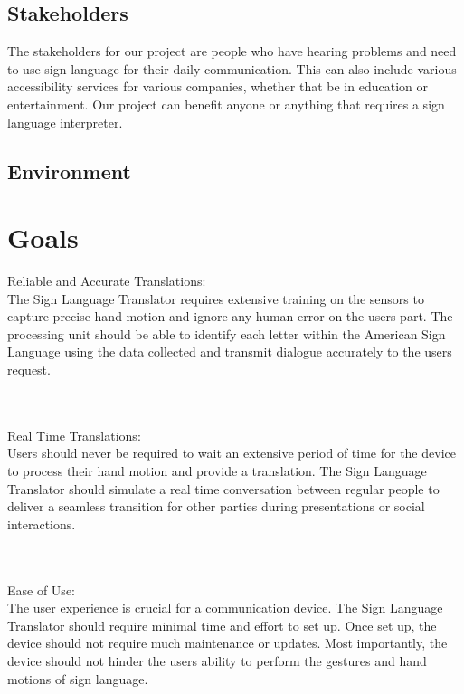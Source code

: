 \documentclass{article}
\begin{document}
\subsection{Stakeholders}

The stakeholders for our project are people who have hearing problems and need to use sign language for their daily
communication. This can also include various accessibility services for various companies, whether that be in education
or entertainment. Our project can benefit anyone or anything that requires a sign language interpreter.

\subsection{Environment}


\section{Goals}

Reliable and Accurate Translations:\\
The Sign Language Translator requires extensive training on the sensors to capture precise hand motion and ignore any
human error on the user\textquotesingle s part. The processing unit should be able to identify each letter within the American Sign Language
using the data collected and transmit dialogue accurately to the user\textquotesingle s request.

\\
\\Real Time Translations:\\
User\textquotesingle s should never be required to wait an extensive period of time for the device to process their hand motion and provide
a translation. The Sign Language Translator should simulate a real time conversation between regular people to deliver a seamless
transition for other parties during presentations or social interactions.

\\
\\Ease of Use:\\
The user experience is crucial for a communication device. The Sign Language Translator should require minimal time 
and effort to set up. Once set up, the device should not require much maintenance or updates. Most importantly,
the device should not hinder the user\textquotesingle s ability to perform the gestures and hand motions of sign language.
\end{document}
